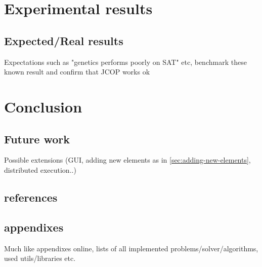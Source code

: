 \documentclass[]{article}
\begin{document}
\section{Experimental results}

\subsection{Expected/Real results}

Expectations such as "genetics performs poorly on SAT" etc, benchmark these known result and confirm that JCOP works ok

\section{Conclusion}

\subsection{Future work}

Possible extensions (GUI, adding new elements as in \ref{sec:adding-new-elements}, distributed execution..)

\subsection{references}

\subsection{appendixes}

Much like appendixes online, lists of all implemented problems/solver/algorithms, used utils/libraries etc.


%
\end{document}
